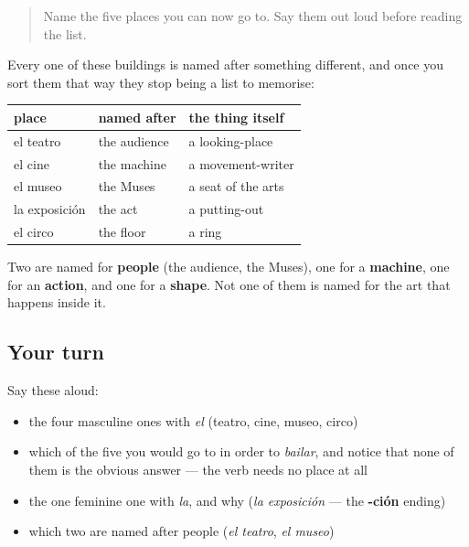 \begin{quote}
Name the five places you can now go to. Say them out loud before reading the list.
\end{quote}

\begin{grammarlens}[title={Grammar Lens: what each name is actually about}]
Every one of these buildings is named after something different, and once you sort them that way they stop being a list to memorise:

\noindent
\begin{tabularx}{\linewidth}{@{}>{\raggedright\arraybackslash}X>{\raggedright\arraybackslash}X>{\raggedright\arraybackslash}X@{}}
\toprule
\textbf{place} & \textbf{named after} & \textbf{the thing itself} \\
\midrule
el teatro & the audience & a looking-place \\
el cine & the machine & a movement-writer \\
el museo & the Muses & a seat of the arts \\
la exposición & the act & a putting-out \\
el circo & the floor & a ring \\
\bottomrule
\end{tabularx}

Two are named for \textbf{people} (the audience, the Muses), one for a \textbf{machine}, one for an \textbf{action}, and one for a \textbf{shape}. Not one of them is named for the art that happens inside it.
\end{grammarlens}

\subsection*{Your turn}
Say these aloud:

\begin{itemize}
\raggedright
  \item the four masculine ones with \emph{el} (teatro, cine, museo, circo)
  \item which of the five you would go to in order to \emph{bailar}, and notice that none of them is the obvious answer — the verb needs no place at all
  \item the one feminine one with \emph{la}, and why (\emph{la exposición} — the \textbf{-ción} ending)
  \item which two are named after people (\emph{el teatro}, \emph{el museo})
\end{itemize}

